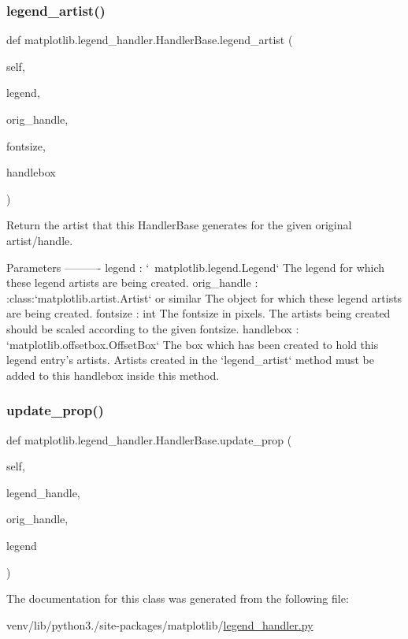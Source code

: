 \subsubsection{\texorpdfstring{legend\+\_\+artist()}{legend\_artist()}}
{\footnotesize\ttfamily def matplotlib.\+legend\+\_\+handler.\+Handler\+Base.\+legend\+\_\+artist (\begin{DoxyParamCaption}\item[{}]{self,  }\item[{}]{legend,  }\item[{}]{orig\+\_\+handle,  }\item[{}]{fontsize,  }\item[{}]{handlebox }\end{DoxyParamCaption})}

\begin{DoxyVerb}Return the artist that this HandlerBase generates for the given
original artist/handle.

Parameters
----------
legend : `~matplotlib.legend.Legend`
    The legend for which these legend artists are being created.
orig_handle : :class:`matplotlib.artist.Artist` or similar
    The object for which these legend artists are being created.
fontsize : int
    The fontsize in pixels. The artists being created should
    be scaled according to the given fontsize.
handlebox : `matplotlib.offsetbox.OffsetBox`
    The box which has been created to hold this legend entry's
    artists. Artists created in the `legend_artist` method must
    be added to this handlebox inside this method.\end{DoxyVerb}
 \mbox{\label{classmatplotlib_1_1legend__handler_1_1HandlerBase_aa54fa79fee69bfec676d9b59b76a29e6}} 
\subsubsection{\texorpdfstring{update\+\_\+prop()}{update\_prop()}}
{\footnotesize\ttfamily def matplotlib.\+legend\+\_\+handler.\+Handler\+Base.\+update\+\_\+prop (\begin{DoxyParamCaption}\item[{}]{self,  }\item[{}]{legend\+\_\+handle,  }\item[{}]{orig\+\_\+handle,  }\item[{}]{legend }\end{DoxyParamCaption})}



The documentation for this class was generated from the following file\+:\begin{DoxyCompactItemize}
\item 
venv/lib/python3./site-\/packages/matplotlib/\hyperlink{legend__handler_8py}{legend\+\_\+handler.\+py}\end{DoxyCompactItemize}
